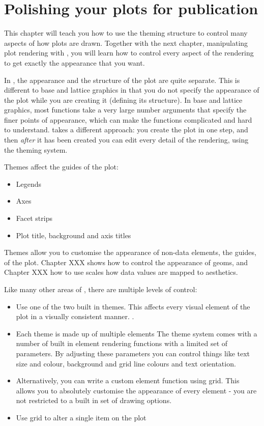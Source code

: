 

\chapter{Polishing your plots for publication}
\label{cha:theming}

This chapter will teach you how to use the theming structure to control many aspects of how \ggplot plots are drawn.  Together with the next chapter, manipulating plot rendering with , you will learn how to control every aspect of the rendering to get exactly the appearance that you want.

In \ggplot, the appearance and the structure of the plot are quite separate.  This is different to base and lattice graphics in that you do not specify the appearance of the plot while you are creating it (defining its structure).  In base and lattice graphics, most functions take a very large number arguments that specify the finer points of appearance, which can make the functions complicated and hard to understand.  \ggplot takes a different approach: you create the plot in one step, and then {\em after} it has been created you can edit every detail of the rendering, using the theming system.

Themes affect the guides of the plot:

\begin{itemize}
  \item Legends
  \item Axes
  \item Facet strips
  \item Plot title, background and axis titles
\end{itemize}

Themes allow you to customise the appearance of non-data elements, the guides, of the plot. Chapter XXX shows how to control the appearance of geoms, and Chapter XXX how to use scales  how data values are mapped to aesthetics.

Like many other areas of \ggplot, there are multiple levels of control:

\begin{itemize}
  \item Use one of the two built in themes.  This affects every visual element of the plot in a visually consistent manner.  .

  \item Each theme is made up of multiple elements The theme system comes with a number of built in element rendering functions with a limited set of parameters.  By adjusting these parameters you can control things like text size and colour, background and grid line colours and text orientation. 
  
  \item Alternatively, you can write a custom element function using grid.  This allows you to absolutely customise the appearance of every element - you are not restricted to a built in set of drawing options.  

  \item Use grid to alter a single item on the plot
\end{itemize}


